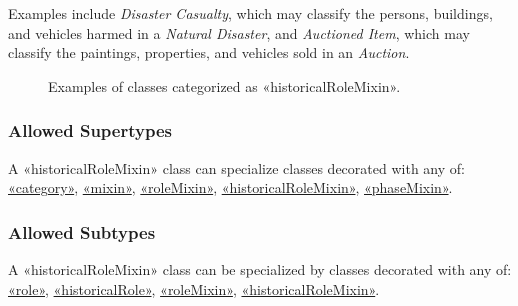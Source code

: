 Examples include \textit{Disaster Casualty}, which may classify the persons, buildings, and vehicles harmed in a \textit{Natural Disaster}, and \textit{Auctioned Item}, which may classify the paintings, properties, and vehicles sold in an \textit{Auction}.

\begin{figure}[h]
    \centering
    
    \caption{Examples of classes categorized as «historicalRoleMixin».}
    \label{fig:historicalRoleMixin-example}
\end{figure}

\subsubsection{Allowed Supertypes}

A «historicalRoleMixin» class can specialize classes decorated with any of: 
\hyperref[stereotype:category]{«category»}, \hyperref[stereotype:mixin]{«mixin»}, \hyperref[stereotype:roleMixin]{«roleMixin»}, \hyperref[stereotype:historicalRoleMixin]{«historicalRoleMixin»}, \hyperref[stereotype:phaseMixin]{«phaseMixin»}.

\subsubsection{Allowed Subtypes}

A «historicalRoleMixin» class can be specialized by classes decorated with any of:
\hyperref[stereotype:role]{«role»}, \hyperref[stereotype:historicalRole]{«historicalRole»}, \hyperref[stereotype:roleMixin]{«roleMixin»}, \hyperref[stereotype:historicalRoleMixin]{«historicalRoleMixin»}.






